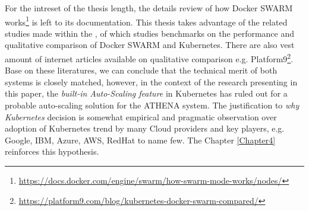 For the intreset of the thesis length, the details review of how Docker SWARM works\footnote{\url{https://docs.docker.com/engine/swarm/how-swarm-mode-works/nodes/}} is left to its documentation. This thesis takes advantage of the related studies made within the \textit{\groupname}, of which studies \parencite{swarmKubeBench2} benchmarks on the performance and qualitative comparison of Docker SWARM and Kubernetes. There are also vest amount of internet articles available on qualitative comparison e.g. Platform9\footnote{\url{https://platform9.com/blog/kubernetes-docker-swarm-compared/}}. Base on these literatures, we can conclude that the technical merit of both systems is closely matched, however, in the context of the research presenting in this paper, the \emph{built-in Auto-Scaling feature} in Kubernetes has ruled out for a probable auto-scaling solution for the ATHENA system. The justification to \emph{why Kubernetes} decision is somewhat empirical and pragmatic observation over adoption of Kubernetes trend by many Cloud providers and key players, e.g. Google, IBM, Azure, AWS, RedHat to name few. The Chapter \ref{Chapter4} reinforces this hypothesis.

